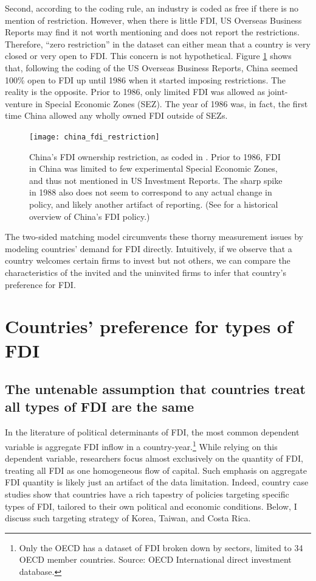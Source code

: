 Second, according to the coding rule, an industry is coded as free if there is
no mention of restriction. However, when there is little FDI, US Overseas
Business Reports may find it not worth mentioning and does not report the
restrictions. Therefore, ``zero restriction'' in the dataset can either mean
that a country is very closed or very open to FDI. This concern is not
hypothetical. Figure \ref{fig:china_fdi_restriction} shows that, following the
coding of the US Overseas Business Reports, China seemed 100\% open to FDI up
until 1986 when it started imposing restrictions. The reality is the opposite.
Prior to 1986, only limited FDI was allowed as joint-venture in Special Economic
Zones (SEZ). The year of 1986 was, in fact, the first time China allowed any
wholly owned FDI outside of SEZs.

\begin{figure}[tbp] \centering
  \texttt{[image: china\_fdi\_restriction]}
  \caption[China's FDI ownership restriction.]{China's FDI ownership
    restriction, as coded in \citet{Pandya2010}. Prior to 1986, FDI in China was
    limited to few experimental Special Economic Zones, and thus not mentioned
    in US Investment Reports. The sharp spike in 1988 also does not seem to
    correspond to any actual change in policy, and likely another artifact of
    reporting. (See \citet{Zebregs2002} for a historical overview of China's FDI
    policy.)}
  \label{fig:china_fdi_restriction}
\end{figure}

The two-sided matching model circumvents these thorny measurement issues by
modeling countries' demand for FDI directly. Intuitively, if we observe that a
country welcomes certain firms to invest but not others, we can compare the
characteristics of the invited and the uninvited firms to infer that country's
preference for FDI.

\section{Countries' preference for types of FDI}
\label{sec:demand_for_FDI_types}

\subsection{The untenable assumption that countries treat all types of FDI are
  the same}

In the literature of political determinants of FDI, the most common dependent
variable is aggregate FDI inflow in a country-year.\footnote{Only the OECD has a
  dataset of FDI broken down by sectors, limited to 34 OECD member countries.
  Source: OECD International direct investment database.} While relying on this
dependent variable, researchers focus almost exclusively on the quantity
of FDI, treating all FDI as one homogeneous flow of capital. Such emphasis on
aggregate FDI quantity is likely just an artifact of the data limitation. Indeed,
country case studies show that countries have a rich tapestry of policies
targeting specific types of FDI, tailored to their own political and economic
conditions. Below, I discuss such targeting strategy of Korea, Taiwan, and Costa
Rica.

